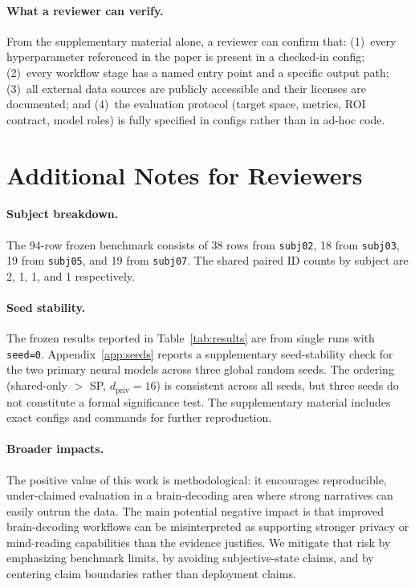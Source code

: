 \documentclass{article}
\begin{document}
\paragraph{What a reviewer can verify.}
From the supplementary material alone, a reviewer can confirm that: (1)~every
hyperparameter referenced in the paper is present in a checked-in config;
(2)~every workflow stage has a named entry point and a specific output path;
(3)~all external data sources are publicly accessible and their licenses are
documented; and (4)~the evaluation protocol (target space, metrics, ROI
contract, model roles) is fully specified in configs rather than in ad-hoc code.

\section{Additional Notes for Reviewers}
\label{app:notes}

\paragraph{Subject breakdown.}
The 94-row frozen benchmark consists of 38 rows from \texttt{subj02}, 18 from
\texttt{subj03}, 19 from \texttt{subj05}, and 19 from \texttt{subj07}.  The
shared paired ID counts by subject are 2, 1, 1, and 1 respectively.

\paragraph{Seed stability.}
The frozen results reported in Table~\ref{tab:results} are from single runs
with \texttt{seed=0}.  Appendix~\ref{app:seeds} reports a supplementary
seed-stability check for the two primary neural models across three global
random seeds.  The ordering (shared-only $>$ SP, $d_\mathrm{priv}\!=\!16$)
is consistent across all seeds, but three seeds do not constitute a formal
significance test.  The supplementary material includes exact configs and
commands for further reproduction.

\paragraph{Broader impacts.}
The positive value of this work is methodological: it encourages reproducible,
under-claimed evaluation in a brain-decoding area where strong narratives can
easily outrun the data.  The main potential negative impact is that improved
brain-decoding workflows can be misinterpreted as supporting stronger privacy or
mind-reading capabilities than the evidence justifies.  We mitigate that risk by
emphasizing benchmark limits, by avoiding subjective-state claims, and by
centering claim boundaries rather than deployment claims.
\end{document}
